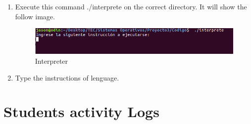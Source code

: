 \documentclass[12pt,twoside]{article}
\begin{document}
\begin{enumerate}
\item Execute this command ./interprete on the correct directory. It will show the follow image.
\begin{figure}[H]
\centering
\includegraphics[width = 0.4\hsize]{./figures/interprete.png}
\caption{Interpreter}
\label{fig:esquema1 de capas}
\end{figure}

\item Type the instructions of lenguage.

\end{enumerate}


\newpage

\section{Students activity Logs}
\end{document}
